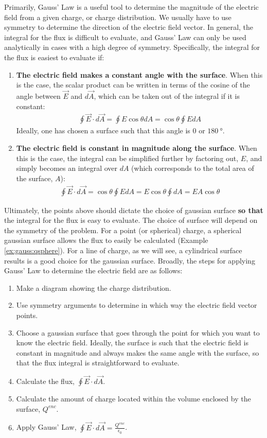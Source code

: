 Primarily, Gauss' Law is a useful tool to determine the magnitude of the electric field from a given charge, or charge distribution. We usually have to use symmetry to determine the direction of the electric field vector. In general, the integral for the flux is difficult to evaluate, and Gauss' Law can only be used analytically in cases with a high degree of symmetry. Specifically, the integral for the flux is easiest to evaluate if:
\begin{enumerate}
\item \textbf{The electric field makes a constant angle with the surface}. When this is the case, the scalar product can be written in terms of the cosine of the angle between $\vec E$ and $d\vec A$, which can be taken out of the integral if it is constant:
\begin{align*}
\oint \vec E\cdot d\vec A=\oint E\cos\theta dA=\cos\theta\oint EdA
\end{align*}
Ideally, one has chosen a surface such that this angle is $0$ or $\SI{180}{\degree}$.
\item \textbf{The electric field is constant in magnitude along the surface}. When this is the case, the integral can be simplified further by factoring out, $E$, and simply becomes an integral over $dA$ (which corresponds to the total area of the surface, $A$):
\begin{align*}
\oint \vec E\cdot d\vec A=\cos\theta\oint EdA =E\cos\theta\oint dA=EA\cos\theta 
\end{align*}
\end{enumerate}
Ultimately, the points above should dictate the choice of gaussian surface \textbf{so that} the integral for the flux is easy to evaluate. The choice of surface will depend on the symmetry of the problem. For a point (or spherical) charge, a spherical gaussian surface allows the flux to easily be calculated (Example \ref{ex:gauss:qsphere}). For a line of charge, as we will see, a cylindrical surface results is a good choice for the gaussian surface. Broadly, the steps for applying Gauss' Law to determine the electric field are as follows:
\begin{enumerate}
\item Make a diagram showing the charge distribution.
\item Use symmetry arguments to determine in which way the electric field vector points.
\item Choose a gaussian surface that goes through the point for which you want to know the electric field. Ideally, the surface is such that the electric field is constant in magnitude and always makes the same angle with the surface, so that the flux integral is straightforward to evaluate.
\item Calculate the flux, $\oint \vec E\cdot d\vec A$.
\item Calculate the amount of charge located within the volume enclosed by the surface, $Q^{enc}$.
\item Apply Gauss' Law, $\oint \vec E\cdot d\vec A=\frac{Q^{enc}}{\epsilon_0} $.
\end{enumerate}
